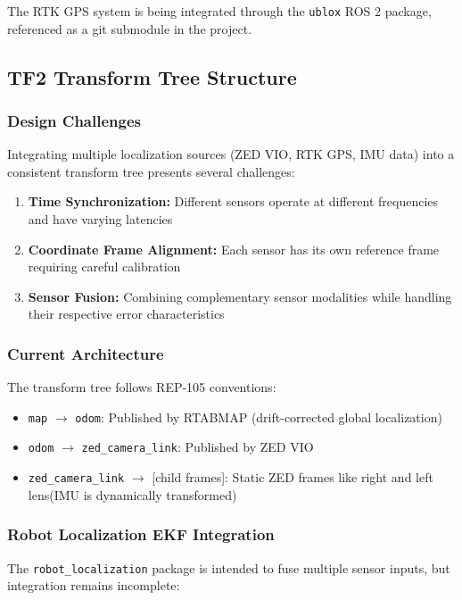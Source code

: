 The RTK GPS system is being integrated through the \texttt{ublox} ROS 2 package, referenced as a git submodule in the project.

\subsection{TF2 Transform Tree Structure}

\subsubsection{Design Challenges}
Integrating multiple localization sources (ZED VIO, RTK GPS, IMU data) into a consistent transform tree presents several challenges:

\begin{enumerate}
    \item \textbf{Time Synchronization:} Different sensors operate at different frequencies and have varying latencies
    \item \textbf{Coordinate Frame Alignment:} Each sensor has its own reference frame requiring careful calibration
    \item \textbf{Sensor Fusion:} Combining complementary sensor modalities while handling their respective error characteristics
\end{enumerate}

\subsubsection{Current Architecture}
The transform tree follows REP-105 conventions:
\begin{itemize}
    \item \texttt{map} $\rightarrow$ \texttt{odom}: Published by RTABMAP (drift-corrected global localization)
    \item \texttt{odom} $\rightarrow$ \texttt{zed\_camera\_link}: Published by ZED VIO
    \item \texttt{zed\_camera\_link} $\rightarrow$ [child frames]: Static ZED frames like right and left lens(IMU  is dynamically transformed)
\end{itemize}

\subsubsection{Robot Localization EKF Integration}
The \texttt{robot\_localization} package is intended to fuse multiple sensor inputs, but integration remains incomplete:

